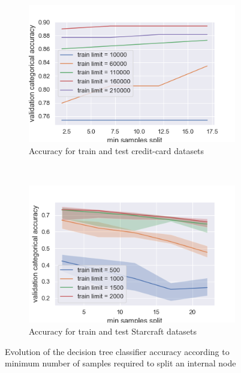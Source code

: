 \documentclass[10pt]{article}
\begin{document}
		\begin{figure}[]
			\centering
			\begin{subfigure}[]{0.45\columnwidth}
				\centering
				\includegraphics[width=\linewidth]{../graphics/tree_creditcard_min_samples_split_score_type_train_limit.png}
				\caption{Accuracy for train and test credit-card datasets}
				\label{tree:tree_creditcard_min_samples_split_score_type_train_limit}
			\end{subfigure}
			~
			\begin{subfigure}[]{0.45\columnwidth}
				\centering
				\includegraphics[width=\linewidth]{../graphics/tree_starcraft_min_samples_split_score_type_train_limit.png}
				\caption{Accuracy for train and test Starcraft datasets}
				\label{tree:tree_starcraft_min_samples_split_score_type_train_limit}
			\end{subfigure}
			\caption{Evolution of the decision tree classifier accuracy according to minimum number of samples required to split an internal node}
			\label{tree:min_samples_split_score_type_score_type}
		\end{figure}
\end{document}
